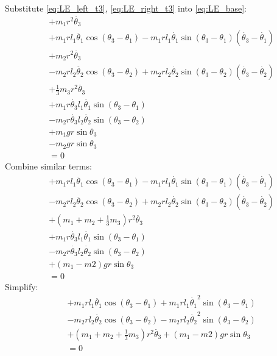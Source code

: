 \documentclass[titlepage]{article}
\numberwithin{equation}{section}
\begin{document}
Substitute \ref{eq:LE_left_t3}, \ref{eq:LE_right_t3} into \ref{eq:LE_base}:
\begin{align}
 &+ m_1 r^2 \ddot{\theta_3} \nonumber \\
 &+ m_1 r l_1 \ddot{\theta_1} \cos{(\theta_3 - \theta_1)} - m_1 r l_1 \dot{\theta_1} \sin{(\theta_3 - \theta_1)} (\dot{\theta_3} - \dot{\theta_1}) \nonumber \\
 &+ m_2 r^2 \ddot{\theta_3} \nonumber \\
 &- m_2 r l_2 \ddot{\theta_2} \cos{(\theta_3 - \theta_2)} + m_2 r l_2 \dot{\theta_2} \sin{(\theta_3 - \theta_2)} (\dot{\theta_3} - \dot{\theta_2}) \nonumber \\
 &+ \frac{1}{3} m_3 r^2 \ddot{\theta_3} \nonumber \\
 &+ m_1 r \dot{\theta_3} l_1 \dot{\theta_1} \sin{(\theta_3 - \theta_1)} \nonumber \\
 &- m_2 r \dot{\theta_3} l_2 \dot{\theta_2} \sin{(\theta_3 - \theta_2)} \nonumber \\
 &+ m_1 g r \sin \theta_3 \nonumber \\
 &- m_2 g r \sin \theta_3 \nonumber \\
 &= 0
\end{align}
Combine similar terms:
\begin{align}
 &+ m_1 r l_1 \ddot{\theta_1} \cos{(\theta_3 - \theta_1)} - m_1 r l_1 \dot{\theta_1} \sin{(\theta_3 - \theta_1)} (\dot{\theta_3} - \dot{\theta_1}) \nonumber \\
 &- m_2 r l_2 \ddot{\theta_2} \cos{(\theta_3 - \theta_2)} + m_2 r l_2 \dot{\theta_2} \sin{(\theta_3 - \theta_2)} (\dot{\theta_3} - \dot{\theta_2}) \nonumber \\
 &+ (m_1 + m_2 + \frac{1}{3} m_3) r^2 \ddot{\theta_3} \nonumber \\
 &+ m_1 r \dot{\theta_3} l_1 \dot{\theta_1} \sin{(\theta_3 - \theta_1)} \nonumber \\
 &- m_2 r \dot{\theta_3} l_2 \dot{\theta_2} \sin{(\theta_3 - \theta_2)} \nonumber \\
 &+ (m_1 - m2) g r \sin \theta_3 \nonumber \\
 &= 0
\end{align}
Simplify:
\begin{align}
 &+ m_1 r l_1 \ddot{\theta_1} \cos{(\theta_3 - \theta_1)} + m_1 r l_1 \dot{\theta_1}^2 \sin{(\theta_3 - \theta_1)} \nonumber \\
 &- m_2 r l_2 \ddot{\theta_2} \cos{(\theta_3 - \theta_2)} - m_2 r l_2 \dot{\theta_2}^2 \sin{(\theta_3 - \theta_2)} \nonumber \\
 &+ (m_1 + m_2 + \frac{1}{3} m_3) r^2 \ddot{\theta_3} + (m_1 - m2) g r \sin \theta_3 \nonumber \\
 &= 0
\end{align}
\end{document}
